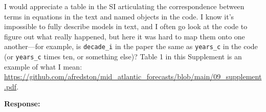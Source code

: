 \documentclass[11pt]{article}
\newcommand{\reviewer}[1]{\par\medskip\noindent\textcolor{revcolor}{#1}\par}
\newenvironment{reply}
{\par\smallskip\begingroup\color{replycolor}\noindent\textbf{Response:}\ }
{\endgroup\par\medskip}
\begin{document}
\reviewer{I would appreciate a table in the SI articulating the correspondence
between terms in equations in the text and named objects in the code. I know it's
impossible to fully describe models in text, and I often go look at the code to
figure out what really happened, but here it was hard to map them onto one
another---for example, is \texttt{decade\_i} in the paper the same as
\texttt{years\_c} in the code (or \texttt{years\_c} times ten, or something else)?
Table 1 in this Supplement is an example of what I mean:
\url{https://github.com/afredston/mid_atlantic_forecasts/blob/main/09_supplement.pdf}.}

\begin{reply}

\end{reply}
\end{document}
